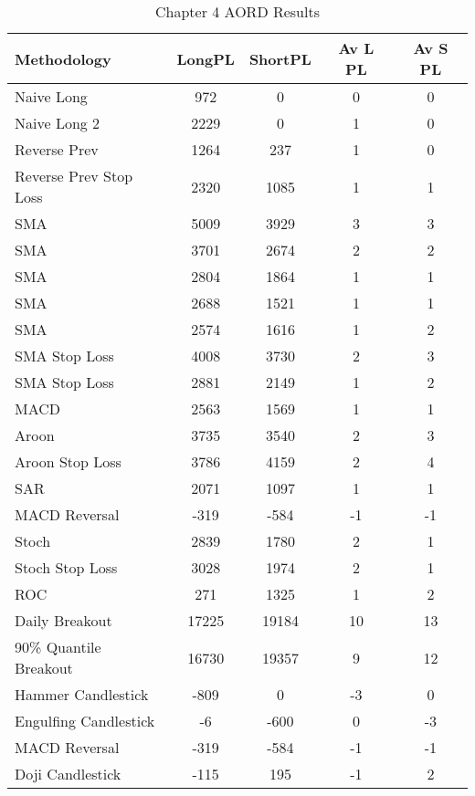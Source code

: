 \begin{table}[ht]
\centering
\caption[Chapter 4 AORD Results]{Chapter 4 AORD Results} 
\label{tab:chp6:aord_summary}
\begin{tabular}{lcccc}
  \toprule Methodology & LongPL & ShortPL & Av L PL & Av S PL \\ 
  \midrule Naive Long & 972 & 0 & 0 & 0 \\ 
  Naive Long 2 & 2229 & 0 & 1 & 0 \\ 
  Reverse Prev & 1264 & 237 & 1 & 0 \\ 
  Reverse Prev Stop Loss & 2320 & 1085 & 1 & 1 \\ 
  SMA & 5009 & 3929 & 3 & 3 \\ 
  SMA & 3701 & 2674 & 2 & 2 \\ 
  SMA & 2804 & 1864 & 1 & 1 \\ 
  SMA & 2688 & 1521 & 1 & 1 \\ 
  SMA & 2574 & 1616 & 1 & 2 \\ 
  SMA Stop Loss & 4008 & 3730 & 2 & 3 \\ 
  SMA Stop Loss & 2881 & 2149 & 1 & 2 \\ 
  MACD & 2563 & 1569 & 1 & 1 \\ 
  Aroon & 3735 & 3540 & 2 & 3 \\ 
  Aroon Stop Loss & 3786 & 4159 & 2 & 4 \\ 
  SAR & 2071 & 1097 & 1 & 1 \\ 
  MACD Reversal & -319 & -584 & -1 & -1 \\ 
  Stoch & 2839 & 1780 & 2 & 1 \\ 
  Stoch Stop Loss & 3028 & 1974 & 2 & 1 \\ 
  ROC & 271 & 1325 & 1 & 2 \\ 
  Daily Breakout & 17225 & 19184 & 10 & 13 \\ 
  90\% Quantile Breakout & 16730 & 19357 & 9 & 12 \\ 
  Hammer Candlestick & -809 & 0 & -3 & 0 \\ 
  Engulfing Candlestick & -6 & -600 & 0 & -3 \\ 
  MACD Reversal & -319 & -584 & -1 & -1 \\ 
  Doji Candlestick & -115 & 195 & -1 & 2 \\ 
   \bottomrule \end{tabular}
\end{table}
